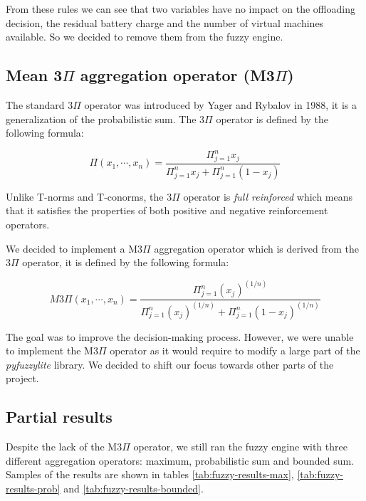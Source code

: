 From these rules we can see that two variables have no impact on the offloading decision, the residual battery charge
and the number of virtual machines available. So we decided to remove them from the fuzzy engine.

\subsection{Mean 3\texorpdfstring{$\Pi$}{Pi} aggregation operator (M3\texorpdfstring{$\Pi$}{Pi})}

The standard 3$\Pi$ operator was introduced by Yager and Rybalov \cite{yager-rybalov-1998} in 1988, it is a
generalization of the probabilistic sum. The 3$\Pi$ operator is defined by the following formula:

\begin{equation}
	\Pi(x_1, \cdots, x_n) = \frac{\Pi_{j=1}^n x_j}{\Pi_{j=1}^n x_j + \Pi_{j=1}^n (1 - x_j)}
\end{equation}

Unlike T-norms and T-conorms, the 3$\Pi$ operator is \textit{full reinforced} which means that it satisfies the
properties of both positive and negative reinforcement operators.

We decided to implement a M3$\Pi$ aggregation operator which is derived from the 3$\Pi$ operator, it is defined by the
following formula:

\begin{equation}
	M3\Pi(x_1, \cdots, x_n) = \frac{\Pi_{j=1}^n (x_j)^{(1/n)}}{\Pi_{j=1}^n (x_j)^{(1/n)} + \Pi_{j=1}^n (1 - x_j)^{(1/n)}}
\end{equation}

The goal was to improve the decision-making process. However, we were unable to implement the M3$\Pi$ operator as it
would require to modify a large part of the \textit{pyfuzzylite} library. We decided to shift our focus towards other
parts of the project.

\subsection{Partial results}

Despite the lack of the M3$\Pi$ operator, we still ran the fuzzy engine with three different aggregation operators:
maximum, probabilistic sum and bounded sum. Samples of the results are shown in tables \ref{tab:fuzzy-results-max},
\ref{tab:fuzzy-results-prob} and \ref{tab:fuzzy-results-bounded}.

